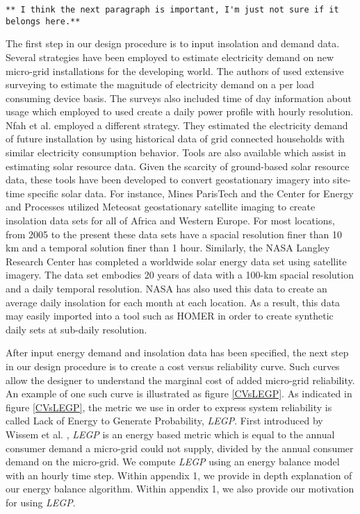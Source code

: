 \documentclass[11p]{article}
\begin{document}
\begin{verbatim}
** I think the next paragraph is important, I'm just not sure if it belongs here.**
\end{verbatim} 
The first step in our design procedure is to input insolation and demand data. 
Several strategies have been employed to estimate electricity demand on new micro-grid installations for the developing world. 
The authors of \cite{Camblong,Alzola} used extensive surveying to estimate the magnitude of electricity demand on a per load consuming device basis. 
The surveys also included time of day information about usage which employed to used create a daily power profile with hourly resolution. 
Nfah et al. \cite{Nfah} employed a different strategy.
They estimated the electricity demand of future installation by using historical data of grid connected households with similar electricity consumption behavior. 
Tools are also available which assist in estimating solar resource data.
Given the scarcity of ground-based solar resource data, these tools have been developed to convert geostationary imagery into site-time specific solar data. 
For instance, Mines ParisTech and the Center for Energy and Processes utilized Meteosat geostationary satellite imaging to create insolation data sets for all of Africa and Western Europe. 
For most locations, from 2005 to the present these data sets have a spacial resolution finer than 10 km and a temporal solution finer than 1 hour.  
Similarly, the NASA Langley Research Center has completed a worldwide solar energy data set using satellite imagery. 
The data set embodies 20 years of data with a 100-km spacial resolution and a daily temporal resolution.  
NASA has also used this data to create an average daily insolation for each month at each location.
As a result, this data may easily imported into a tool such as HOMER in order to create synthetic daily sets at sub-daily resolution.   

After input energy demand and insolation data has been specified, the next step in our design procedure is to create a cost versus reliability curve. 
Such curves allow the designer to understand the marginal cost of added micro-grid reliability.
An example of one such curve is illustrated as figure \ref{CVsLEGP}.
As indicated in figure \ref{CVsLEGP}, the metric we use in order to express system reliability is called Lack of Energy to Generate Probability, \emph{LEGP}. 
First introduced by Wissem et al. \cite{Wissem}, \emph{LEGP} is an energy based metric which is equal to the annual consumer demand a micro-grid could not supply, divided by the annual consumer demand on the micro-grid.
We compute \emph{LEGP} using an energy balance model with an hourly time step. 
Within appendix 1, we provide in depth explanation of our energy balance algorithm.
Within appendix 1, we also provide our motivation for using \emph{LEGP}.
\end{document}
